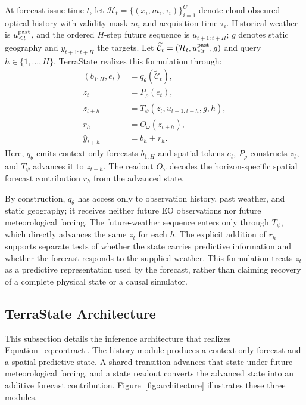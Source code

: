 \documentclass[letterpaper]{article} %
\begin{document}
At forecast issue time $t$, let
$\mathcal H_t=\{(x_i,m_i,\tau_i)\}_{i=1}^{C}$ denote cloud-obscured optical
history with validity mask $m_i$ and acquisition time $\tau_i$. Historical
weather is $u_{\leq t}^{\rm past}$, and the ordered $H$-step future sequence is
$u_{t+1:t+H}$; $g$ denotes static geography and $y_{t+1:t+H}$ the targets. Let
$\widetilde{\mathcal C}_t=(\mathcal H_t,u_{\leq t}^{\rm past},g)$ and query
$h\in\{1,\ldots,H\}$. TerraState realizes this formulation through:
\begin{equation}
\begin{aligned}
(b_{1:H},e_t)&=q_\theta(\widetilde{\mathcal C}_t),\\
z_t&=P_\rho(e_t),\\
z_{t+h}&=T_\psi(z_t,u_{t+1:t+h},g,h),\\
r_h&=O_\omega(z_{t+h}),\\
\widehat y_{t+h}&=b_h+r_h .
\end{aligned}
\label{eq:contract}
\end{equation}
Here, $q_\theta$ emits context-only forecasts $b_{1:H}$ and spatial tokens
$e_t$, $P_\rho$ constructs $z_t$, and $T_\psi$ advances it to $z_{t+h}$.
The readout $O_\omega$ decodes the horizon-specific spatial forecast
contribution $r_h$ from the advanced state.

By construction, $q_\theta$ has access only to observation history, past
weather, and static geography; it receives neither future EO observations nor
future meteorological forcing. The future-weather sequence enters only through
$T_\psi$, which directly advances the same $z_t$ for each $h$. The explicit
addition of $r_h$ supports separate tests of whether the state carries
predictive information and whether the forecast responds to the supplied
weather. This formulation treats $z_t$ as a predictive representation used by
the forecast, rather than claiming recovery of a complete physical state or a
causal simulator.

\subsection{TerraState Architecture}

This subsection details the inference architecture that realizes
Equation~\ref{eq:contract}. The history module produces a context-only
forecast and a spatial predictive state. A shared transition advances that
state under future meteorological forcing, and a state readout converts the
advanced state into an additive forecast contribution. Figure~\ref{fig:architecture}
illustrates these three modules.
\end{document}

